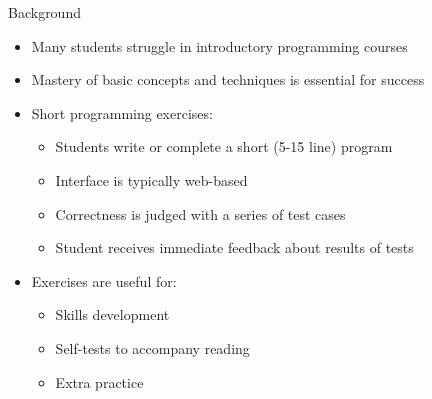\documentclass{beamer}
\begin{document}
\begin{frame}{Background}

\begin{itemize}
  \item Many students struggle in introductory programming courses
  \item Mastery of basic concepts and techniques is essential for success
  \item Short programming exercises:
  \begin{itemize}
    \item Students write or complete a short (5-15 line) program
    \item Interface is typically web-based
    \item Correctness is judged with a series of test cases
    \item Student receives immediate feedback about results of tests
  \end{itemize}
  \item Exercises are useful for:
  \begin{itemize}
    \item Skills development
    \item Self-tests to accompany reading
    \item Extra practice
  \end{itemize}
\end{itemize}

\end{frame}
\end{document}
